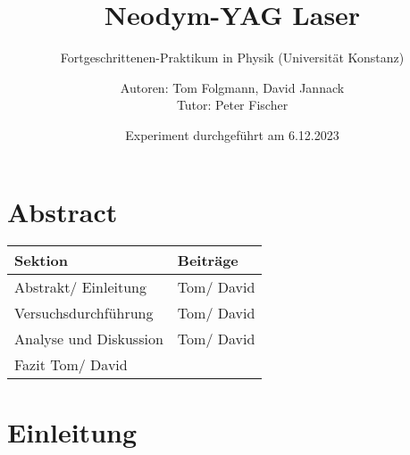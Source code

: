 \documentclass[
    oneside, 
    footinclude=off, 
    captions=tableheading, 
    DIV=12;usenames,
    dvipsnames
]{scrartcl}
\begin{document}
    \title{Neodym-YAG Laser}
    \subtitle{Fortgeschrittenen-Praktikum in Physik (Universität Konstanz)}
    \author{Autoren: Tom Folgmann, David Jannack \\ \large{Tutor: Peter Fischer}}
    \date{Experiment durchgeführt am 6.12.2023}
    \maketitle
    \thispagestyle{empty}
    
    \section*{Abstract}
        

    \vspace{2cm}
    \begin{table}[H]
        \centering
            \begin{tabular}{l|l}
            Sektion & Beiträge \\\hline\hline
            Abstrakt/ Einleitung & Tom/ David\\
            Versuchsdurchführung & Tom/ David\\
            Analyse und Diskussion & Tom/ David\\
            Fazit Tom/ David&
        \end{tabular}
    \end{table}

    \newpage


    \tableofcontents
    \thispagestyle{empty}	
    \newpage
    \setcounter{page}{1}


\newpage
\section{Einleitung}
    

%    
\end{document}
